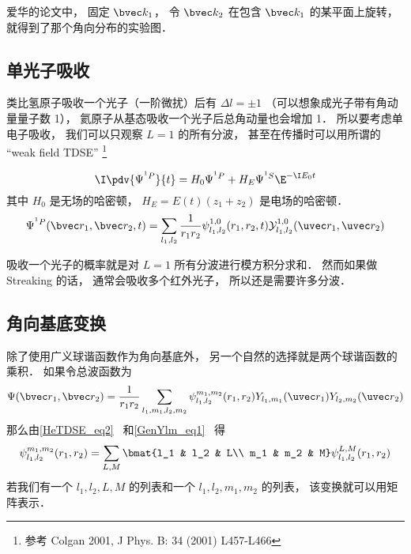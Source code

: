 爱华的论文中， 固定 $\bvec k_1$， 令 $\bvec k_2$ 在包含 $\bvec k_1$ 的某平面上旋转， 就得到了那个角向分布的实验图．

\subsection{单光子吸收}

类比氢原子吸收一个光子（一阶微扰）后有 $\Delta l = \pm 1$ （可以想象成光子带有角动量量子数 1）， 氦原子从基态吸收一个光子后总角动量也会增加 1． 所以要考虑单电子吸收， 我们可以只观察 $L = 1$ 的所有分波， 甚至在传播时可以用所谓的 “weak field TDSE” \footnote{参考 Colgan 2001, J Phys. B: 34 (2001) L457-L466}

\begin{equation}
\I \pdv{\Psi^{^1P}}{t} = H_0 \Psi^{^1P} + H_E \Psi^{^1S} \E^{-\I E_0 t}
\end{equation}
其中 $H_0$ 是无场的哈密顿， $H_E = E(t) (z_1 + z_2)$ 是电场的哈密顿．
\begin{equation}
\Psi^{^1P}(\bvec r_1, \bvec r_2, t) = \sum_{l_1, l_2} \frac{1}{r_1 r_2} \psi_{l_1, l_2}^{1, 0} (r_1, r_2, t) \mathcal Y_{l_1, l_2}^{1, 0} (\uvec r_1, \uvec r_2)
\end{equation}

吸收一个光子的概率就是对 $L = 1$ 所有分波进行模方积分求和． 然而如果做 Streaking 的话， 通常会吸收多个红外光子， 所以还是需要许多分波．

\subsection{角向基底变换}
除了使用广义球谐函数作为角向基底外， 另一个自然的选择就是两个球谐函数的乘积． 如果令总波函数为
\begin{equation}\label{HeAnal_eq6}
\Psi(\bvec r_1, \bvec r_2) = \frac{1}{r_1 r_2} \sum_{l_1, m_1, l_2, m_2} \psi_{l_1, l_2}^{m_1, m_2}(r_1, r_2) Y_{l_1, m_1}(\uvec r_1) Y_{l_2, m_2} (\uvec r_2)
\end{equation}
那么由\autoref{HeTDSE_eq2}~ 和\autoref{GenYlm_eq1}~ 得
\begin{equation}\label{HeAnal_eq7}
\psi_{l_1, l_2}^{m_1, m_2}(r_1, r_2) = \sum_{L,M} \bmat{l_1 & l_2 & L\\ m_1 & m_2 & M} \psi_{l_1, l_2}^{L,M}(r_1, r_2)
\end{equation}
若我们有一个 $l_1, l_2, L, M$ 的列表和一个 $l_1, l_2, m_1, m_2$ 的列表， 该变换就可以用矩阵表示．


